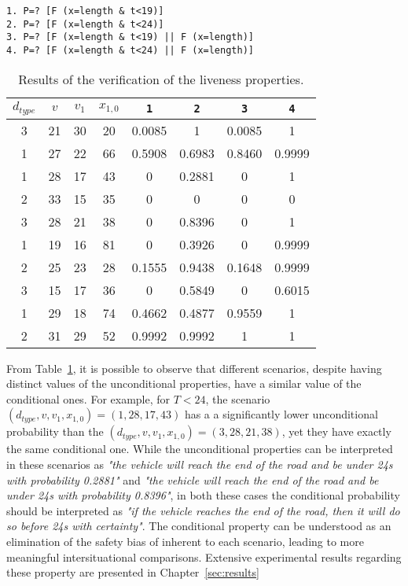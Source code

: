 \begin{minipage}{\linewidth}
{\vspace{1em}
\begin{lstlisting}
1. P=? [F (x=length & t<19)]
2. P=? [F (x=length & t<24)]
3. P=? [F (x=length & t<19) || F (x=length)]
4. P=? [F (x=length & t<24) || F (x=length)]
\end{lstlisting}
}
\end{minipage}

\bgroup
\def\arraystretch{1.3}
\begin{table}[h]
\centering
\begin{tabular}{|c|c|c|c||c|c||c|c|}
\hline
\textbf{$d_{type}$} & \textbf{$v$} & \textbf{$v_1$} & \textbf{$x_{1,0}$} & \texttt{1} & \texttt{2} & \texttt{3} & \texttt{4}  \\ \hline \hline
3 & 21 & 30 & 20 & 0.0085 & 1 & 0.0085 & 1 \\ \hline
1 & 27 & 22 & 66 & 0.5908 & 0.6983 & 0.8460 & 0.9999 \\ \hline
1 & 28 & 17 & 43 & 0 & 0.2881 & 0 & 1 \\ \hline
2 & 33 & 15 & 35 & 0 & 0 & 0 & 0 \\ \hline
3 & 28 & 21 & 38 & 0 & 0.8396 & 0 & 1 \\ \hline
1 & 19 & 16 & 81 & 0 & 0.3926 & 0 & 0.9999 \\ \hline
2 & 25 & 23 & 28 & 0.1555 & 0.9438 & 0.1648 & 0.9999 \\ \hline
3 & 15 & 17 & 36 & 0 & 0.5849 & 0 & 0.6015 \\ \hline
1 & 29 & 18 & 74 & 0.4662 & 0.4877 & 0.9559 & 1 \\ \hline
2 & 31 & 29 & 52 & 0.9992 & 0.9992 & 1 & 1 \\ \hline
\end{tabular}
\caption{Results of the verification of the liveness properties.}
\label{tab:liveness}
\end{table}
\egroup

From Table~\ref{tab:liveness}, it is possible to observe that different scenarios, despite having distinct values of the unconditional properties, have a similar value of the conditional ones. For example, for $T < 24$, the scenario $(d_{type}, v, v_1, x_{1,0}) = (1, 28, 17, 43)$ has a a significantly lower unconditional probability than the $(d_{type}, v, v_1, x_{1,0}) = (3, 28, 21, 38)$, yet they have exactly the same conditional one. While the unconditional properties can be interpreted in these scenarios as \textit{"the vehicle will reach the end of the road and be under 24s with probability 0.2881"} and \textit{"the vehicle will reach the end of the road and be under 24s with probability 0.8396"},  in both these cases the conditional probability should be interpreted as \textit{"if the vehicle reaches the end of the road, then it will do so before 24s with certainty"}. The conditional property can be understood as an elimination of the safety bias of inherent to each scenario, leading to more meaningful intersituational comparisons. Extensive experimental results regarding these property are presented in Chapter~\ref{sec:results}

